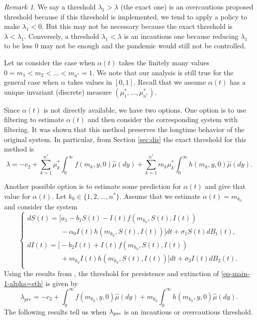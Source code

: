 \documentclass[12pt]{amsart}
\theoremstyle{remark}
\newtheorem{rem}{Remark}
\numberwithin{equation}{section}
\numberwithin{equation}{section}
\newcommand{\1}{\boldsymbol{1}}
\def\hat{\widehat}
\begin{document}
\begin{rem}
We say	a threshold $\lambda_1>\lambda$ (the exact one) is an overcautious proposed threshold %
because if this threshold is implemented,
we tend to
apply a policy to make $\lambda_1<0$. But this may not be necessary because the exact threshold is $\lambda<\lambda_1$.
	Conversely, a threshold $\lambda_1<\lambda$ is an incautious one because reducing $\lambda_1$ to be less 0 may not be enough and the pandemic would
still not be controlled.
\end{rem}

Let us consider the case when $\alpha(t)$ takes the finitely many values $0=m_1< m_2<\dots<m_{n^*}=1$. We note that our analysis is still true for the general case when $\alpha$ takes values in $[0,1]$.
Recall that we assume $\alpha(t)$ has a unique invariant (discrete) measure $(\mu_1^*,\dots,\mu_{n^*}^*)$.

Since
$\alpha(t)$ is not directly available, we have two options.
One option is to use filtering to estimate $\alpha(t)$ and then consider the corresponding system with filtering. It was shown that this method preserves the longtime behavior of the original system.
In particular, from Section \ref{sec:dis}
the exact threshold for this method is
$$
\lambda=-c_2+\sum_{k=1}^{n^*} \mu^*_k\int_0^\infty f(m_k,y,0)\hat\mu(dy)+\sum_{k=1}^{n^*} m_k\mu^*_k\int_0^\infty h(m_k,y,0)\hat\mu(dy).
$$

Another possible option is to estimate some prediction for $\alpha(t)$ and give that value for $\alpha(t)$.
Let $k_0\in\{1,2,\dots,n^*\}$. Assume that we estimate $\alpha(t)=m_{k_0}$ and consider the system
\begin{equation}\label{eq-main-1-alpha=sth}
\begin{cases}
dS(t)=\Big[a_1-b_1S(t)-I(t)f(m_{k_0},S(t),I(t))\\
\hspace{2cm}-\alpha_0I(t)h(m_{k_0},S(t),I(t))\Big]dt + \sigma_1 S(t) dB_1(t),\\[1ex]
dI(t)=\Big[-b_2I(t) + I(t)f(m_{k_0},S(t),I(t))\\
\hspace{2cm}+m_{k_0}I(t)h(m_{k_0},S(t),I(t))\Big]dt + \sigma_2I(t) dB_2(t).\\
\end{cases}
\end{equation}
Using the results from \cite{DNY-SPA}, the threshold for persistence and extinction of \eqref{eq-main-1-alpha=sth} is given by
$$
\lambda_{pre}=-c_2+\int_0^\infty f(m_{k_0},y,0)\hat\mu(dy)+m_{k_0}\int_0^\infty h(m_{k_0},y,0)\hat\mu(dy).
$$
The following
results tell us when $\lambda_{{\rm\tiny pre}}$ is an incautious or overcautious threshold.
\end{document}
